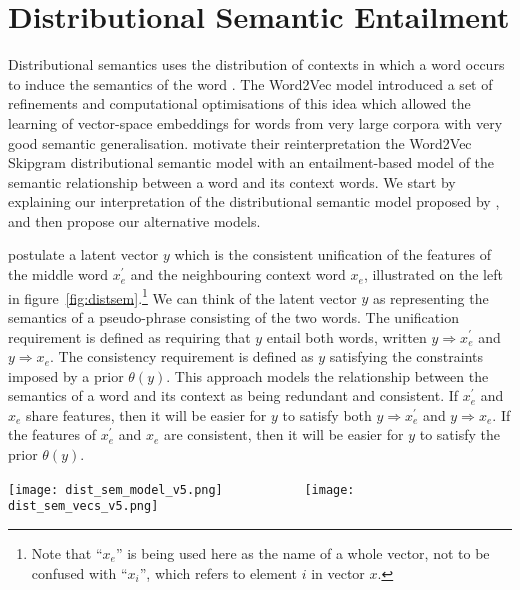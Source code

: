 \documentclass[11pt,a4paper]{article}
\newcommand{\entail}{{\Rightarrow}}
\begin{document}
\section{Distributional Semantic Entailment}
\label{sec:sem}


Distributional semantics uses the distribution of contexts in which a word
occurs to induce the semantics of the word
\citep{Harris54,Deerwester1990,Schutze93}.  The Word2Vec model
\citep{word2vec1} introduced a set of refinements and computational
optimisations of this idea which allowed the learning of vector-space
embeddings for words from very large corpora with very good semantic
generalisation.  \citet{Henderson16_acl} motivate their reinterpretation the
Word2Vec Skipgram \citep{word2vec1} distributional semantic model with an
entailment-based model of the semantic relationship between a word and its
context words.  We start by explaining our interpretation of the
distributional semantic model proposed by \citet{Henderson16_acl}, and then
propose our alternative models.

\citet{Henderson16_acl} postulate a latent vector $y$ which is the consistent
unification of the features of the middle word $x^\prime_e$ and the neighbouring
context word $x_e$, illustrated on the left in
figure~\ref{fig:distsem}.\footnote{Note that ``$x_e$'' is being used here as
  the name of a whole vector, not to be confused with ``$x_i$'', which refers
  to element $i$ in vector $x$.}  We can think of the latent vector $y$ as
representing the semantics of a pseudo-phrase consisting of the two words.
The unification requirement is defined as requiring that $y$ entail both
words, written $y\entail x^\prime_e$ and $y\entail x_e$.  The consistency
requirement is defined as $y$ satisfying the constraints imposed by a prior
$\theta(y)$.  This approach models the relationship between the semantics of a
word and its context as being redundant and consistent.  If $x^\prime_e$ and
$x_e$ share features, then it will be easier for $y$ to satisfy both
$y\entail x^\prime_e$ and $y\entail x_e$.  If the features of $x^\prime_e$ and
$x_e$ are consistent, then it will be easier for $y$ to satisfy the
prior $\theta(y)$.

\begin{figure*}
  \begin{center}
    \texttt{[image: dist\_sem\_model\_v5.png]}
    ~~~    ~~~    ~~~    
    \texttt{[image: dist\_sem\_vecs\_v5.png]}
  \end{center}
  \caption{The distributional semantic model of a word and its context (left),
  and its approximation in the word2hyp models (right).}
  \label{fig:distsem}
\end{figure*}
\end{document}
